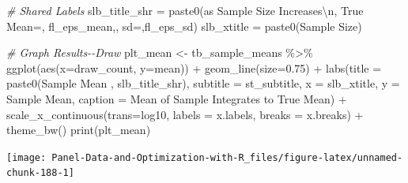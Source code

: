 \documentclass[
]{book}
\newenvironment{Shaded}{\begin{snugshade}}{\end{snugshade}}
\newcommand{\AttributeTok}[1]{\textcolor[rgb]{0.77,0.63,0.00}{#1}}
\newcommand{\CommentTok}[1]{\textcolor[rgb]{0.56,0.35,0.01}{\textit{#1}}}
\newcommand{\FloatTok}[1]{\textcolor[rgb]{0.00,0.00,0.81}{#1}}
\newcommand{\FunctionTok}[1]{\textcolor[rgb]{0.00,0.00,0.00}{#1}}
\newcommand{\NormalTok}[1]{#1}
\newcommand{\OtherTok}[1]{\textcolor[rgb]{0.56,0.35,0.01}{#1}}
\newcommand{\SpecialCharTok}[1]{\textcolor[rgb]{0.00,0.00,0.00}{#1}}
\newcommand{\StringTok}[1]{\textcolor[rgb]{0.31,0.60,0.02}{#1}}
\begin{document}
\begin{Shaded}
\begin{Highlighting}[]
\CommentTok{\# Shared Labels}
\NormalTok{slb\_title\_shr }\OtherTok{=} \FunctionTok{paste0}\NormalTok{(}\StringTok{\textquotesingle{}as Sample Size Increases}\SpecialCharTok{\textbackslash{}n}\StringTok{\textquotesingle{}}\NormalTok{,}
                       \StringTok{\textquotesingle{}True Mean=\textquotesingle{}}\NormalTok{, fl\_eps\_mean,}\StringTok{\textquotesingle{}, sd=\textquotesingle{}}\NormalTok{,fl\_eps\_sd)}
\NormalTok{slb\_xtitle }\OtherTok{=} \FunctionTok{paste0}\NormalTok{(}\StringTok{\textquotesingle{}Sample Size\textquotesingle{}}\NormalTok{)}

\CommentTok{\# Graph Results{-}{-}Draw}
\NormalTok{plt\_mean }\OtherTok{\textless{}{-}}\NormalTok{ tb\_sample\_means }\SpecialCharTok{\%\textgreater{}\%}
  \FunctionTok{ggplot}\NormalTok{(}\FunctionTok{aes}\NormalTok{(}\AttributeTok{x=}\NormalTok{draw\_count, }\AttributeTok{y=}\NormalTok{mean)) }\SpecialCharTok{+}
  \FunctionTok{geom\_line}\NormalTok{(}\AttributeTok{size=}\FloatTok{0.75}\NormalTok{) }\SpecialCharTok{+}
  \FunctionTok{labs}\NormalTok{(}\AttributeTok{title =} \FunctionTok{paste0}\NormalTok{(}\StringTok{\textquotesingle{}Sample Mean \textquotesingle{}}\NormalTok{, slb\_title\_shr),}
       \AttributeTok{subtitle =}\NormalTok{ st\_subtitle,}
       \AttributeTok{x =}\NormalTok{ slb\_xtitle,}
       \AttributeTok{y =} \StringTok{\textquotesingle{}Sample Mean\textquotesingle{}}\NormalTok{,}
       \AttributeTok{caption =} \StringTok{\textquotesingle{}Mean of Sample Integrates to True Mean\textquotesingle{}}\NormalTok{) }\SpecialCharTok{+}
  \FunctionTok{scale\_x\_continuous}\NormalTok{(}\AttributeTok{trans=}\StringTok{\textquotesingle{}log10\textquotesingle{}}\NormalTok{, }\AttributeTok{labels =}\NormalTok{ x.labels, }\AttributeTok{breaks =}\NormalTok{ x.breaks) }\SpecialCharTok{+}
  \FunctionTok{theme\_bw}\NormalTok{()}
\FunctionTok{print}\NormalTok{(plt\_mean)}
\end{Highlighting}
\end{Shaded}

\begin{center}\texttt{[image: Panel-Data-and-Optimization-with-R\_files/figure-latex/unnamed-chunk-188-1]} \end{center}
\end{document}
